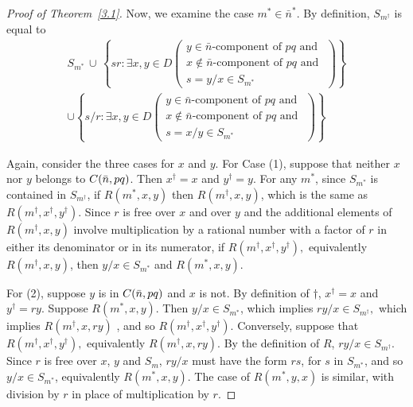 \documentclass[12pt,fullpage]{article}
\theoremstyle{definition}
\theoremstyle{remark}
\begin{document}
\begin{proof}[Proof of Theorem~\ref{3.1}]
Now, we examine the case $m^*\in\bar{n}^*$.  By definition, $S_{m^\dagger}$ is equal to
\[
  \begin{gathered}
  S_{m^*}\,\cup\, \left\{
    sr: \exists x,y\in D\left(
      \begin{gathered}
        y\in\bar{n}\mbox{-component of }pq\mbox{ and }\\
        x\not\in\bar{n}\mbox{-component of }pq\mbox{ and }\\
        s=y/x\in S_{m^*} 
      \end{gathered}
    \right)\right\}\\
  \cup\left\{
    s/r: \exists x,y\in D\left(
      \begin{gathered}
        y\in\bar{n}\mbox{-component of }pq\mbox{ and }\\
        x\not\in\bar{n}\mbox{-component of }pq\mbox{ and }\\
        s=x/y\in S_{m^*} 
      \end{gathered}
    \right)\right\}
  \end{gathered}
  \]

  Again, consider the three cases for $x$ and $y$.  For Case (1), suppose that neither $x$ nor $y$ belongs to $C(\bar{n},pq)$.  Then $x^\dagger=x$ and $y^\dagger=y$.  For any $m^*$, since $S_{m^*}$ is contained in $S_{m^\dagger}$, if $R(m^*,x,y)$ then $R(m^\dagger,x,y)$, which is the same as $R(m^\dagger,x^\dagger,y^\dagger)$.  Since $r$ is free over  $x$ and over $y$  and the additional elements of $R(m^\dagger,x,y)$ involve multiplication by a rational number with a factor of $r$ in either its denominator or in its numerator, if $R(m^\dagger,x^\dagger,y^\dagger),$ equivalently $R(m^\dagger,x,y)$, then $y/x\in S_{m^*}$ and $R(m^*,x,y).$ 

For (2), suppose  $y$ is in $C(\bar{n},pq)$ and $x$ is not.  By definition of $\dagger$, $x^\dagger=x$ and $y^\dagger=ry$.  Suppose $R(m^*,x,y)$.   Then $y/x\in S_{m^*}$, which implies $ry/x\in S_{m^\dagger},$ which implies $R(m^\dagger,x,ry)$ , and so $R(m^\dagger,x^\dagger,y^\dagger)$.  Conversely, suppose that  $R(m^\dagger,x^\dagger,y^\dagger),$ equivalently $R(m^\dagger,x,ry)$.  By the definition of $R$,  $ry/x\in S_{m^\dagger}$.  Since $r$ is free over $x$, $y$ and $S_m$, $ry/x$ must have the form $rs$, for $s$ in $S_{m^*}$, and so $y/x\in S_{m^*}$, equivalently $R(m^*,x,y)$.  The case of $R(m^*,y,x)$ is similar, with division by $r$ in place of multiplication by $r$.  


\end{proof}
\end{document}
